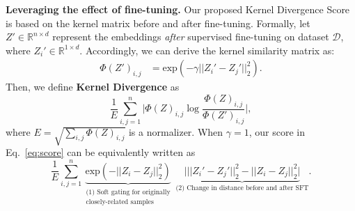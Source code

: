 

\noindent\textbf{Leveraging the effect of fine-tuning.} Our proposed Kernel Divergence Score is based on the kernel matrix before and after fine-tuning. 
Formally, let $Z' \in \mathbb{R}^{n \times d}$ represent the embeddings \emph{after} supervised fine-tuning on dataset $\mathcal{D}$, where $Z_i' \in \mathbb{R}^{1 \times d}$.
Accordingly, we can derive the kernel similarity matrix as:
\begin{equation}
\label{eq:rbf}
    \begin{split}
        \Phi(Z')_{i,j} &= \text{exp}(-\gamma||Z_i' - Z_j'||_2^2).
    \end{split}
\end{equation}
Then, we define \textbf{Kernel Divergence} as
\begin{equation}
    \frac{1}{E} \sum_{i,j=1}^n  \bigg\vert\Phi(Z)_{i,j} \log \frac{\Phi(Z)_{i,j}}{\Phi(Z')_{i,j}} \bigg\vert,
    \label{eq:score}
\end{equation}
where $E = \sqrt{\sum_{i,j} \Phi(Z)_{i,j}}$ is a normalizer.
When $\gamma=1$, our score in Eq.~\eqref{eq:score} can be equivalently written as
\begin{equation}
\label{eq:score_decomp}
    \frac{1}{E} \sum_{i,j=1}^n \underbrace{\text{exp}(-||Z_i - Z_j||_2^2)}_{\substack{\text{(1) Soft gating for originally} \\ \text{closely-related samples}}} \; \underbrace{\bigg\vert ||Z_i' - Z_j'||_2^2 - ||Z_i - Z_j||_2^2 \bigg\vert}_{\text{(2) Change in distance before and after SFT}}.
\end{equation}
